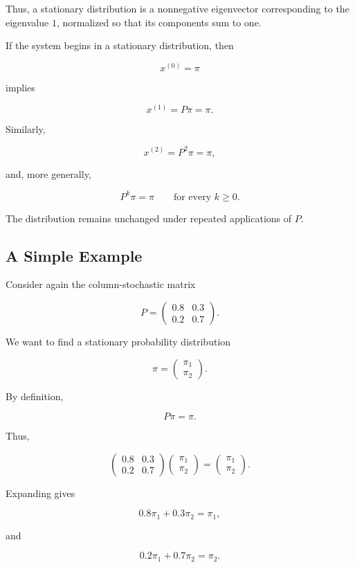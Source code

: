 \documentclass[11pt,a4paper]{article}
\theoremstyle{definition}
\theoremstyle{remark}
\begin{document}
Thus, a stationary distribution
is a nonnegative eigenvector
corresponding to the eigenvalue
$1$, normalized so that its
components sum to one.

If the system begins in a
stationary distribution,
then

\[
x^{(0)}=\pi
\]

implies

\[
x^{(1)}=P\pi=\pi.
\]

Similarly,

\[
x^{(2)}=P^2\pi=\pi,
\]

and, more generally,

\[
\boxed{
P^k\pi=\pi
\qquad
\text{for every }k\geq0.
}
\]

The distribution remains
unchanged under repeated
applications of $P$.

\subsection{A Simple Example}

Consider again the
column-stochastic matrix

\[
P=
\begin{pmatrix}
0.8&0.3\\
0.2&0.7
\end{pmatrix}.
\]

We want to find a stationary
probability distribution

\[
\pi=
\begin{pmatrix}
\pi_1\\
\pi_2
\end{pmatrix}.
\]

By definition,

\[
P\pi=\pi.
\]

Thus,

\[
\begin{pmatrix}
0.8&0.3\\
0.2&0.7
\end{pmatrix}
\begin{pmatrix}
\pi_1\\
\pi_2
\end{pmatrix}
=
\begin{pmatrix}
\pi_1\\
\pi_2
\end{pmatrix}.
\]

Expanding gives

\[
0.8\pi_1+0.3\pi_2=\pi_1,
\]

and

\[
0.2\pi_1+0.7\pi_2=\pi_2.
\]
\end{document}
